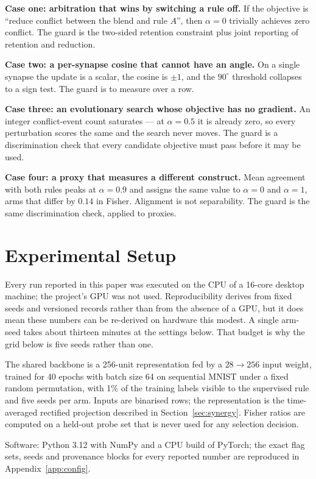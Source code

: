 \documentclass[11pt]{article}
\begin{document}
\textbf{Case one: arbitration that wins by switching a rule off.} If the objective is ``reduce
conflict between the blend and rule $A$'', then $\alpha = 0$ trivially achieves zero conflict. The
guard is the two-sided retention constraint plus joint reporting of retention and reduction.

\textbf{Case two: a per-synapse cosine that cannot have an angle.} On a single synapse the update
is a scalar, the cosine is $\pm 1$, and the $90^\circ$ threshold collapses to a sign test. The
guard is to measure over a row.

\textbf{Case three: an evolutionary search whose objective has no gradient.} An integer
conflict-event count saturates --- at $\alpha = 0.5$ it is already zero, so every perturbation
scores the same and the search never moves. The guard is a discrimination check that every
candidate objective must pass before it may be used.

\textbf{Case four: a proxy that measures a different construct.} Mean agreement with both rules
peaks at $\alpha = 0.9$ and assigns the same value to $\alpha = 0$ and $\alpha = 1$, arms that
differ by $0.14$ in Fisher. Alignment is not separability. The guard is the same discrimination
check, applied to proxies.

\section{Experimental Setup}

Every run reported in this paper was executed on the CPU of a 16-core desktop machine; the
project's GPU was not used. Reproducibility derives from fixed seeds and versioned records rather
than from the absence of a GPU, but it does mean these numbers can be re-derived on hardware this
modest. A single arm-seed takes about thirteen minutes at the settings below. That budget is why the grid
below is five seeds rather than one.

The shared backbone is a 256-unit representation fed by a $28 \to 256$ input weight, trained for
40 epochs with batch size 64 on sequential MNIST under a fixed random permutation, with 1\% of the
training labels visible to the supervised rule and five seeds per arm. Inputs are binarised rows;
the representation is the time-averaged rectified projection described in
Section~\ref{sec:synergy}. Fisher ratios are computed on a held-out probe set that is never used
for any selection decision.

Software: Python 3.12 with NumPy and a CPU build of PyTorch; the exact flag sets, seeds and
provenance blocks for every reported number are reproduced in Appendix~\ref{app:config}.
\end{document}
